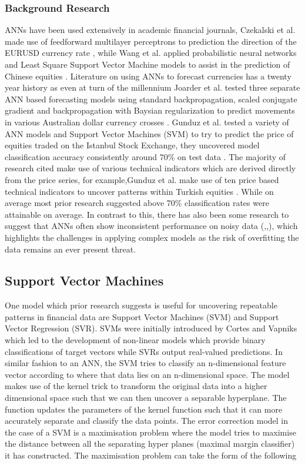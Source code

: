 \documentclass[11pt, a4paper]{article}
\begin{document}
\subsubsection{Background Research}
ANNs have been used extensively in academic financial journals, Czekalski et al. made use of feedforward multilayer perceptrons to prediction the direction of the EURUSD currency rate \cite{Czekalski2015}, while Wang et al. applied probabilistic neural networks and  Least Square Support Vector Machine models to assist in the prediction of Chinese equities \cite{Wang2014} . Literature on using ANNs to forecast currencies has a twenty year history as even at turn of the millennium Joarder et al.  tested three separate ANN based forecasting models using standard backpropagation, scaled conjugate gradient and backpropagation with Baysian regularization to predict movements in various Australian dollar currency crosses \cite{Joarder2013}. Gunduz et al. tested a variety of ANN models and Support Vector Machines (SVM) to try to predict the price of equities traded on the Istanbul Stock Exchange, they uncovered model classification accuracy consistently around 70\% on test data \cite{Gunduz2017} . \newline The majority of research cited make use of various technical indicators which are derived directly from the price series, for example,Gunduz et al. make use of ten price based technical indicators to uncover patterns within Turkish equities \cite{Gunduz2017}. While on average most prior research suggested above 70\% classification rates were attainable on average. In contrast to this, there has also been some research to suggest that ANNs often show inconsistent performance on noisy data (\cite{Kim2003},\cite{Kumar2006},\cite{Kim2000}), which highlights the challenges in applying complex models as the risk of overfitting the data remains an ever present threat. 

\subsection{Support Vector Machines}
One model which prior research suggests is useful for uncovering repeatable patterns in financial data are Support Vector Machines (SVM) and Support Vector Regression (SVR). SVMs were initially introduced by Cortes and Vapniks \cite{Cortes1995} which led to the development of non-linear models which provide binary classifications of target vectors while SVRs output real-valued predictions. In similar fashion to an ANN, the SVM tries to classify an n-dimensional feature vector according to where that data lies on an n-dimensional space.
\newline The model makes use of the kernel trick \cite{kerneltrick} to transform the original data into a higher dimensional space such that we can then uncover a separable hyperplane. The function updates the parameters of the kernel function such that it can more accurately separate and classify the data points. The error correction model in the case of a SVM is a maximisation problem where the model tries to maximise the distance between all the separating hyper planes (maximal margin classifier) it has constructed.  The maximisation problem can take the form of the following
\end{document}
